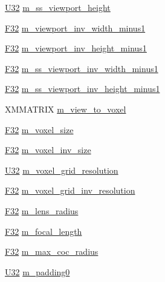 \begin{DoxyCompactItemize}
\hyperlink{namespacemage_a41c104c036fba3756a74e19f793eeaa1}{U32} \hyperlink{structmage_1_1_camera_buffer_a6bbc5a57e9f456518afacf0a0e5633ed}{m\+\_\+ss\+\_\+viewport\+\_\+height}
\item 
\hyperlink{namespacemage_aa97e833b45f06d60a0a9c4fc22ae02c0}{F32} \hyperlink{structmage_1_1_camera_buffer_a3d56a38eb30fb0f0778d23f61f9988fa}{m\+\_\+viewport\+\_\+inv\+\_\+width\+\_\+minus1}
\item 
\hyperlink{namespacemage_aa97e833b45f06d60a0a9c4fc22ae02c0}{F32} \hyperlink{structmage_1_1_camera_buffer_a05564cd690597c4700ca292c942c0737}{m\+\_\+viewport\+\_\+inv\+\_\+height\+\_\+minus1}
\item 
\hyperlink{namespacemage_aa97e833b45f06d60a0a9c4fc22ae02c0}{F32} \hyperlink{structmage_1_1_camera_buffer_ad881a3acbf1eed761374a50296e35e47}{m\+\_\+ss\+\_\+viewport\+\_\+inv\+\_\+width\+\_\+minus1}
\item 
\hyperlink{namespacemage_aa97e833b45f06d60a0a9c4fc22ae02c0}{F32} \hyperlink{structmage_1_1_camera_buffer_a62f3a9c95c3e3cecfc1744de82ac2ca2}{m\+\_\+ss\+\_\+viewport\+\_\+inv\+\_\+height\+\_\+minus1}
\item 
X\+M\+M\+A\+T\+R\+IX \hyperlink{structmage_1_1_camera_buffer_aa019004337d0882c26fe9e742623a16c}{m\+\_\+view\+\_\+to\+\_\+voxel}
\item 
\hyperlink{namespacemage_aa97e833b45f06d60a0a9c4fc22ae02c0}{F32} \hyperlink{structmage_1_1_camera_buffer_a19c4cc07e7c138df4cd31b506ab86289}{m\+\_\+voxel\+\_\+size}
\item 
\hyperlink{namespacemage_aa97e833b45f06d60a0a9c4fc22ae02c0}{F32} \hyperlink{structmage_1_1_camera_buffer_a93cc54b7058ff4bc2472572e1547134c}{m\+\_\+voxel\+\_\+inv\+\_\+size}
\item 
\hyperlink{namespacemage_a41c104c036fba3756a74e19f793eeaa1}{U32} \hyperlink{structmage_1_1_camera_buffer_a291d49bb4e06ac8986318e365eaf219b}{m\+\_\+voxel\+\_\+grid\+\_\+resolution}
\item 
\hyperlink{namespacemage_aa97e833b45f06d60a0a9c4fc22ae02c0}{F32} \hyperlink{structmage_1_1_camera_buffer_a03a9db0d516d3547477da2417ecdc07d}{m\+\_\+voxel\+\_\+grid\+\_\+inv\+\_\+resolution}
\item 
\hyperlink{namespacemage_aa97e833b45f06d60a0a9c4fc22ae02c0}{F32} \hyperlink{structmage_1_1_camera_buffer_ac3b147c3f8971a8b06bfcb3bd971179c}{m\+\_\+lens\+\_\+radius}
\item 
\hyperlink{namespacemage_aa97e833b45f06d60a0a9c4fc22ae02c0}{F32} \hyperlink{structmage_1_1_camera_buffer_a5ecb7ec90a7bc1900846d53488315d33}{m\+\_\+focal\+\_\+length}
\item 
\hyperlink{namespacemage_aa97e833b45f06d60a0a9c4fc22ae02c0}{F32} \hyperlink{structmage_1_1_camera_buffer_a324324132e7cd8d0d0259a47d0305430}{m\+\_\+max\+\_\+coc\+\_\+radius}
\item 
\hyperlink{namespacemage_a41c104c036fba3756a74e19f793eeaa1}{U32} \hyperlink{structmage_1_1_camera_buffer_a56019b41362cd7ddb5d747ed4705d854}{m\+\_\+padding0}
\end{DoxyCompactItemize}


